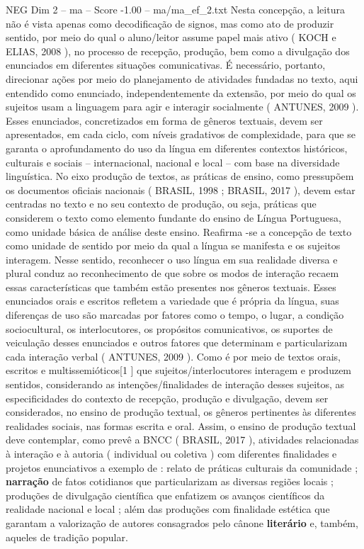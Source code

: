 \begin{textsample}{NEG Dim 2 – ma – Score -1.00 – ma/ma\_ef\_2.txt}
Nesta concepção, a leitura não é vista apenas como decodificação de signos, mas como ato de produzir sentido, por meio do qual o aluno/leitor assume papel mais ativo ( KOCH e ELIAS, 2008 ), no processo de recepção, produção, bem como a divulgação dos enunciados em diferentes situações comunicativas.
É necessário, portanto, direcionar ações por meio do planejamento de atividades fundadas no texto, aqui entendido como enunciado, independentemente da extensão, por meio do qual os sujeitos usam a linguagem para agir e interagir socialmente ( ANTUNES, 2009 ).
Esses enunciados, concretizados em forma de gêneros textuais, devem ser apresentados, em cada ciclo, com níveis gradativos de complexidade, para que se garanta o aprofundamento do uso da língua em diferentes contextos históricos, culturais e sociais – internacional, nacional e local – com base na diversidade linguística.
No eixo produção de textos, as práticas de ensino, como pressupõem os documentos oficiais nacionais ( BRASIL, 1998 ; BRASIL, 2017 ), devem estar centradas no texto e no seu contexto de produção, ou seja, práticas que considerem o texto como elemento fundante do ensino de Língua Portuguesa, como unidade básica de análise deste ensino.
Reafirma -se a concepção de texto como unidade de sentido por meio da qual a língua se manifesta e os sujeitos interagem.
Nesse sentido, reconhecer o uso língua em sua realidade diversa e plural conduz ao reconhecimento de que sobre os modos de interação recaem essas características que também estão presentes nos gêneros textuais.
Esses enunciados orais e escritos refletem a variedade que é própria da língua, suas diferenças de uso são marcadas por fatores como o tempo, o lugar, a condição sociocultural, os interlocutores, os propósitos comunicativos, os suportes de veiculação desses enunciados e outros fatores que determinam e particularizam cada interação verbal ( ANTUNES, 2009 ).
Como é por meio de textos orais, escritos e multissemióticos[1 ] que sujeitos/interlocutores interagem e produzem sentidos, considerando as intenções/finalidades de interação desses sujeitos, as especificidades do contexto de recepção, produção e divulgação, devem ser considerados, no ensino de produção textual, os gêneros pertinentes às diferentes realidades sociais, nas formas escrita e oral.
Assim, o ensino de produção textual deve contemplar, como prevê a BNCC ( BRASIL, 2017 ), atividades relacionadas à interação e à autoria ( individual ou coletiva ) com diferentes finalidades e projetos enunciativos a exemplo de : relato de práticas culturais da comunidade ; \textbf{narração} de fatos cotidianos que particularizam as diversas regiões locais ; produções de divulgação científica que enfatizem os avanços científicos da realidade nacional e local ; além das produções com finalidade estética que garantam a valorização de autores consagrados pelo cânone \textbf{literário} e, também, aqueles de tradição popular.

\end{textsample}
